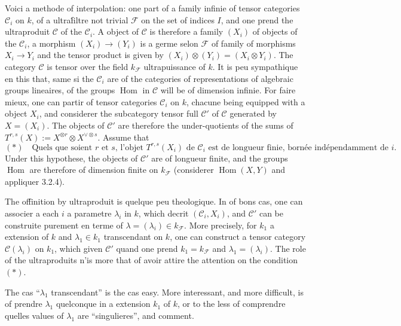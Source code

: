 \documentclass[11pt,a4paper]{article}
\theoremstyle{plain}
\theoremstyle{definition}
\DeclareMathOperator{\Hom}{Hom}
\begin{document}
Voici a methode of interpolation: one part of a family infinie of tensor categories $\mathcal{C}_i$ on $k$, of a ultra\'filtre not trivial $\mathcal{F}$ on the set of indices $I$, and one prend the ultraproduit $\mathcal{C}$ of the $\mathcal{C}_i$. A object of $\mathcal{C}$ is therefore a family $(X_i)$ of objects of the $\mathcal{C}_i$, a morphism $(X_i) \to (Y_i)$ is a germe selon $\mathcal{F}$ of family of morphisms $X_i \to Y_i$ and the tensor product is given by $(X_i) \otimes (Y_i) = (X_i \otimes Y_i)$. The category $\mathcal{C}$ is tensor over the field $k_{\mathcal{F}}$ ultrapuissance of $k$. It is peu sympathique en this that, same si the $\mathcal{C}_i$ are of the categories of representations of algebraic groups lineaires, of the groups $\Hom$ in $\mathcal{C}$ will be of dimension infinie. For faire mieux, one can partir of tensor categories $\mathcal{C}_i$ on $k$, chacune being equipped with a object $X_i$, and considerer the subcategory tensor full $\mathcal{C}'$ of $\mathcal{C}$ generated by $X = (X_i)$. The objects of $\mathcal{C}'$ are therefore the under-quotients of the sums of $T^{r,s}(X) := X^{\otimes r} \otimes X^{\vee \otimes s}$. Assume that
\begin{equation*}
(\ast) \quad \text{Quels que soient $r$ et $s$, l'objet $T^{r,s}(X_i)$ de $\mathcal{C}_i$ est de longueur finie, born\'ee ind\'ependamment de $i$.}
\end{equation*}
Under this hypothese, the objects of $\mathcal{C}'$ are of longueur finite, and the groups $\Hom$ are therefore of dimension finite on $k_{\mathcal{F}}$ (considerer $\Hom(X,Y)$ and appliquer 3.2.4).

The of\'finition by ultraproduit is quelque peu theologique. In of bons cas, one can associer a each $i$ a parametre $\lambda_i$ in $k$, which decrit $(\mathcal{C}_i, X_i)$, and $\mathcal{C}'$ can be construite purement en terme of $\lambda = (\lambda_i) \in k_{\mathcal{F}}$. More precisely, for $k_1$ a extension of $k$ and $\lambda_1 \in k_1$ transcendant on $k$, one can construct a tensor category $\mathcal{C}(\lambda_i)$ on $k_1$, which given $\mathcal{C}'$ quand one prend $k_1 = k_{\mathcal{F}}$ and $\lambda_1 = (\lambda_i)$. The role of the ultraproduits n'is more that of avoir attire the attention on the condition $(\ast)$.

The cas ``$\lambda_1$ transcendant'' is the cas easy. More interessant, and more difficult, is of prendre $\lambda_1$ quelconque in a extension $k_1$ of $k$, or to the less of comprendre quelles values of $\lambda_1$ are ``singulieres'', and comment.
\end{document}
